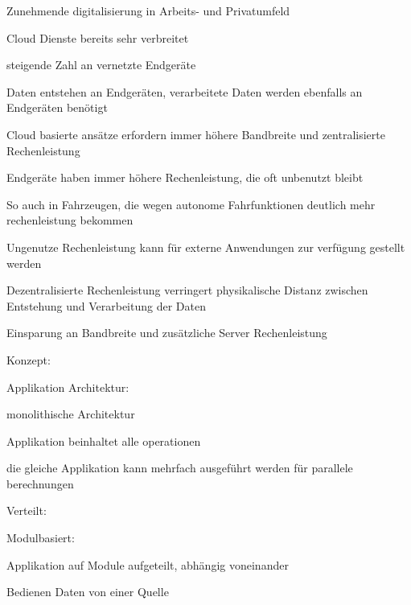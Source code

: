 \begin{notes}
\begin{notes}
        \item Zunehmende digitalisierung in Arbeits- und Privatumfeld
        \item Cloud Dienste bereits sehr verbreitet
        \item steigende Zahl an vernetzte Endgeräte
        \item Daten entstehen an Endgeräten, verarbeitete Daten werden ebenfalls an Endgeräten benötigt
        \item Cloud basierte ansätze erfordern immer höhere Bandbreite und zentralisierte Rechenleistung
        \item Endgeräte haben immer höhere Rechenleistung, die oft unbenutzt bleibt
        \item So auch in Fahrzeugen, die wegen autonome Fahrfunktionen deutlich mehr rechenleistung bekommen
        \item Ungenutze Rechenleistung kann für externe Anwendungen zur verfügung gestellt werden
        \item Dezentralisierte Rechenleistung verringert physikalische Distanz zwischen Entstehung und Verarbeitung der Daten
        \item Einsparung an Bandbreite und zusätzliche Server Rechenleistung
    \end{notes}

    \item Konzept:
    \begin{notes}
        \item Applikation Architektur:
        \begin{notes}
            \item monolithische Architektur
            \begin{notes}
                \item Applikation beinhaltet alle operationen
                \item die gleiche Applikation kann mehrfach ausgeführt werden für parallele berechnungen
            \end{notes}
            \item Verteilt:
            \begin{notes}
                \item Modulbasiert:

                    \item Applikation auf Module aufgeteilt, abhängig voneinander
                    \item Bedienen Daten von einer Quelle
 

\end{notes}
\end{notes}
\end{notes}
\end{notes}
